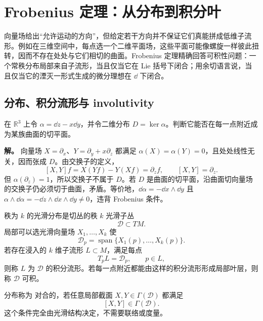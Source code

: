 \chapter{Frobenius 定理：从分布到积分叶} \label{chap:math-geometric-structures}

向量场给出“允许运动的方向”，但给定若干方向并不保证它们真能拼成低维子流形。例如在三维空间中，每点选一个二维平面场，这些平面可能像螺旋一样彼此扭转，因而不存在处处与它们相切的曲面。Frobenius 定理精确回答可积性问题：一个常秩分布局部来自子流形，当且仅当它在 Lie 括号下闭合；用余切语言说，当且仅当它的湮灭一形式生成的微分理想在 $\dd$ 下闭合。

\section{分布、积分流形与 involutivity}

\begin{workedexample}[不可积的平面分布]
在 \(\mathbb R^3\) 上令 \(\alpha=\dd z-x\dd y\)，并令二维分布 \(D=\ker\alpha\)。判断它能否在每一点附近成为某族曲面的切平面。

\textbf{解。} 向量场 \(X=\partial_x\)、\(Y=\partial_y+x\partial_z\) 都满足 \(\alpha(X)=\alpha(Y)=0\)，且处处线性无关，因而张成 \(D\)。由交换子的定义，
\[
[X,Y]f=X(Yf)-Y(Xf)=\partial_z f,\qquad [X,Y]=\partial_z.
\]
但 \(\alpha(\partial_z)=1\)，所以交换子不属于 \(D\)。若 \(D\) 是曲面的切平面，沿曲面切向量场的交换子仍必须切于曲面，矛盾。等价地，\(\dd\alpha=-\dd x\wedge\dd y\) 且 \(\alpha\wedge\dd\alpha=-\dd z\wedge\dd x\wedge\dd y\ne0\)，违背 Frobenius 条件。
\end{workedexample}


秩为 $k$ 的光滑分布是切丛的秩 $k$ 光滑子丛
\[
\mathcal D\subset TM.
\]
局部可以选光滑向量场 $X_1,\ldots,X_k$ 使
\[
\mathcal D_p
=\operatorname{span}\{X_1(p),\ldots,X_k(p)\}.
\]
若存在浸入的 $k$ 维子流形 $L\subset M$，满足每点
\[
T_pL=\mathcal D_p,
\qquad p\in L,
\]
则称 $L$ 为 $\mathcal D$ 的积分流形。若每一点附近都能由这样的积分流形形成局部叶层，则称 $\mathcal D$ 可积。

分布称为 对合的，若任意局部截面 $X,Y\in\Gamma(\mathcal D)$ 都满足
\begin{equation}\label{eq:math-dg-frobenius-involutive}
[X,Y]\in\Gamma(\mathcal D).
\end{equation}
这个条件完全由光滑结构决定，不需要联络或度量。

